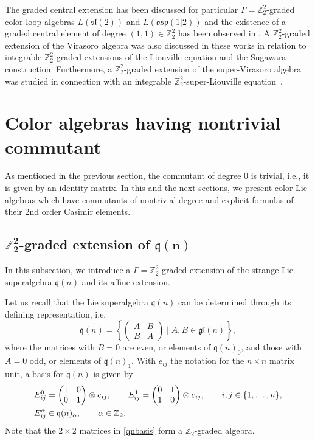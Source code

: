 \documentclass[pdftex]{sigma}
\numberwithin{equation}{section}
\theoremstyle{definition}
\def\nn{\notag}
\def\Z2{\mathbb{Z}_2^2}
\def\osp{\mathfrak{osp}}
\def\gl{\mathfrak{gl}}
\def\sl{\mathfrak{sl}}
\def\q{\mathfrak{q}}
\begin{document}
The graded central extension has been discussed for particular $\Gamma = \Z2$-graded color loop algebras $L(\sl(2))$ and $L(\osp(1|2))$ and the existence of a graded central element of degree ${(1,1) \in \Z2}$ has been observed in \cite{AIKTTslint,AiSe}.
A $\Z2$-graded extension of the Virasoro algebra was also discussed in these works in relation to integrable $\Z2$-graded extensions of the Liouville equation and the Sugawara construction. Furthermore, a $\Z2$-graded extension of the super-Virasoro algebra was studied in connection with an integrable $\Z2$-super-Liouville equation~\cite{AFITTsuper}.


\section{Color algebras having nontrivial commutant} \label{SEC:Eg1}


As mentioned in the previous section, the commutant of degree $0$ is trivial, i.e., it is given by an identity matrix.
In this and the next sections, we present color Lie algebras which have commutants of nontrivial degree and explicit formulas of their 2nd order Casimir elements.


\subsection[Z\_2\^{}2-graded extension of q(n)]{$\boldsymbol{\Z2}$-graded extension of $\boldsymbol{\q(n)}$} \label{SEC:qn}

In this subsection, we introduce a $\Gamma = \Z2$-graded extension of the strange Lie superalgebra $\q(n)$ and its affine extension.

Let us recall that the Lie superalgebra $\q(n)$ can be determined through its defining representation, i.e.\
\begin{equation*}
	\q(n) = \left\{
	\left( \begin{matrix} A&B\\B&A \end{matrix} \right) \mid
	A,B\in \gl(n) \right\},
\end{equation*}
where the matrices with $B=0$ are even, or elements of $\q(n)_{0}$, and those
with $A=0$ odd, or elements of $\q(n)_{1}$.
With $e_{ij}$ the notation for the $n\times n$ matrix unit,
a basis for $\q(n)$ is given by%
\begin{align}
	&E_{ij}^0 = \left( \begin{matrix} 1&0\\0&1 \end{matrix} \right)\otimes e_{ij},\qquad
	E_{ij}^1 = \left( \begin{matrix} 0&1\\1&0 \end{matrix} \right)\otimes e_{ij},\qquad
	i,j\in\{1,\ldots,n\},
	\nn\\
	&E_{ij}^{\alpha} \in \q(n)_{\alpha}, \qquad \alpha \in \mathbb{Z}_2.
	\label{qnbasis}
\end{align}
Note that the $ 2\times 2$ matrices in \eqref{qnbasis} form a $\mathbb{Z}_2$-graded algebra.
\end{document}
